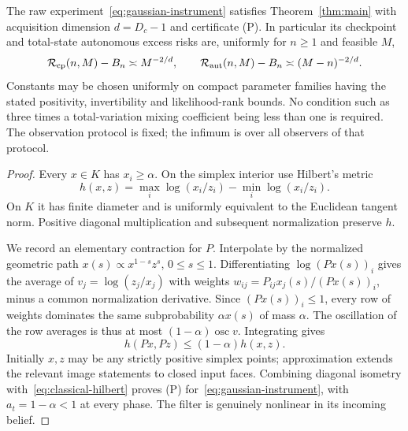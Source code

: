 \begin{theorem}\label{thm:gaussian}
The raw experiment~\eqref{eq:gaussian-instrument} satisfies Theorem~\ref{thm:main} with acquisition dimension $d=D_c-1$ and certificate (P). In particular its checkpoint and total-state autonomous excess risks are, uniformly for $n\ge1$ and feasible $M$,
\[
 \mathcal R_{\rm cp}(n,M)-B_n\asymp M^{-2/d},\qquad
 \mathcal R_{\rm aut}(n,M)-B_n\asymp(M-n)^{-2/d}.
\]
Constants may be chosen uniformly on compact parameter families having the stated positivity, invertibility and likelihood-rank bounds. No condition such as three times a total-variation mixing coefficient being less than one is required. The observation protocol is fixed; the infimum is over all observers of that protocol.
\end{theorem}
\begin{proof}
Every $x\in K$ has $x_i\ge\alpha$. On the simplex interior use Hilbert's metric
\[
 h(x,z)=\max_i\log(x_i/z_i)-\min_i\log(x_i/z_i).
\]
On $K$ it has finite diameter and is uniformly equivalent to the Euclidean tangent norm. Positive diagonal multiplication and subsequent normalization preserve $h$.

We record an elementary contraction for $P$. Interpolate by the normalized geometric path $x(s)\propto x^{1-s}z^s$, $0\le s\le1$. Differentiating $\log(Px(s))_i$ gives the average of $v_j=\log(z_j/x_j)$ with weights
$w_{ij}=P_{ij}x_j(s)/(Px(s))_i$, minus a common normalization derivative. Since $(Px(s))_i\le1$, every row of weights dominates the same subprobability $\alpha x(s)$ of mass $\alpha$. The oscillation of the row averages is thus at most $(1-\alpha)\operatorname{osc}v$. Integrating gives
\begin{equation}\label{eq:classical-hilbert}
 h(Px,Pz)\le(1-\alpha)h(x,z).
\end{equation}
Initially $x,z$ may be any strictly positive simplex points; approximation extends the relevant image statements to closed input faces. Combining diagonal isometry with~\eqref{eq:classical-hilbert} proves (P) for~\eqref{eq:gaussian-instrument}, with $a_t=1-\alpha<1$ at every phase. The filter is genuinely nonlinear in its incoming belief.


\end{proof}
